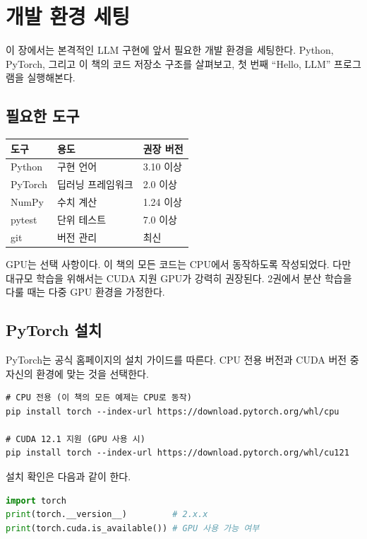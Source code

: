 \chapter{개발 환경 세팅}
\label{ch:setup}

이 장에서는 본격적인 LLM 구현에 앞서 필요한 개발 환경을 세팅한다. Python, PyTorch, 그리고 이 책의 코드 저장소 구조를 살펴보고, 첫 번째 ``Hello, LLM'' 프로그램을 실행해본다.

\section{필요한 도구}

\begin{center}
\begin{tabularx}{\textwidth}{lXl}
\toprule
\textbf{도구} & \textbf{용도} & \textbf{권장 버전} \\
\midrule
Python & 구현 언어 & 3.10 이상 \\
PyTorch & 딥러닝 프레임워크 & 2.0 이상 \\
NumPy & 수치 계산 & 1.24 이상 \\
pytest & 단위 테스트 & 7.0 이상 \\
git & 버전 관리 & 최신 \\
\bottomrule
\end{tabularx}
\end{center}

GPU는 선택 사항이다. 이 책의 모든 코드는 CPU에서 동작하도록 작성되었다. 다만 대규모 학습을 위해서는 CUDA 지원 GPU가 강력히 권장된다. 2권에서 분산 학습을 다룰 때는 다중 GPU 환경을 가정한다.

\section{PyTorch 설치}

PyTorch는 공식 홈페이지의 설치 가이드를 따른다. CPU 전용 버전과 CUDA 버전 중 자신의 환경에 맞는 것을 선택한다.

\begin{lstlisting}[style=bashstyle]
# CPU 전용 (이 책의 모든 예제는 CPU로 동작)
pip install torch --index-url https://download.pytorch.org/whl/cpu

# CUDA 12.1 지원 (GPU 사용 시)
pip install torch --index-url https://download.pytorch.org/whl/cu121
\end{lstlisting}

설치 확인은 다음과 같이 한다.

\begin{lstlisting}[language=Python]
import torch
print(torch.__version__)         # 2.x.x
print(torch.cuda.is_available()) # GPU 사용 가능 여부
\end{lstlisting}

